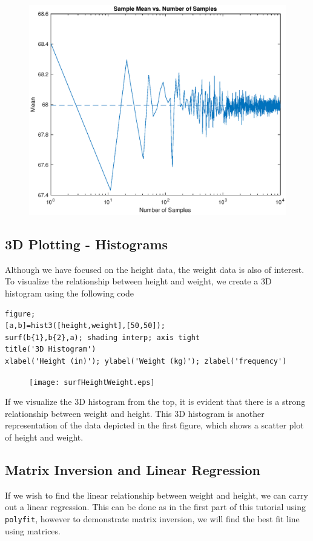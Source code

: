 \documentclass[12pt]{article}
\begin{document}
\begin{figure}[H]
\centering
\includegraphics[width=0.75\linewidth]{plotLawLargeNum.eps}
\end{figure}

\subsection{3D Plotting - Histograms}

Although we have focused on the height data, the weight data is also of interest. To visualize the relationship between height and weight, we create a 3D histogram using the following code

\begin{lstlisting}[frame=single]
%% 3D Histogram
figure;
[a,b]=hist3([height,weight],[50,50]);
surf(b{1},b{2},a); shading interp; axis tight
title('3D Histogram')
xlabel('Height (in)'); ylabel('Weight (kg)'); zlabel('frequency')
\end{lstlisting}

\begin{figure}[H]
\centering
\texttt{[image: surfHeightWeight.eps]}
\end{figure}

If we visualize the 3D histogram from the top, it is evident that there is a strong relationship between weight and height. This 3D histogram is another representation of the data depicted in the first figure, which shows a scatter plot of height and weight. 

\subsection{Matrix Inversion and Linear Regression}

If we wish to find the linear relationship between weight and height, we can carry out a linear regression. This can be done as in the first part of this tutorial using \lstinline|polyfit|, however to demonstrate matrix inversion, we will find the best fit line using matrices. 
\end{document}
